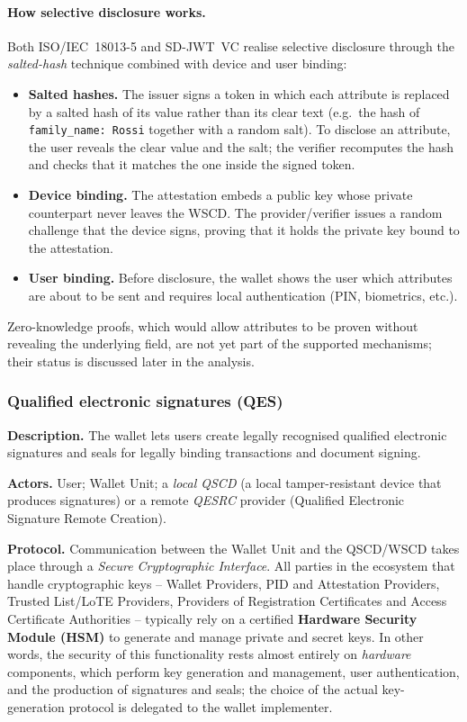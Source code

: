 \documentclass{article}
\begin{document}
\paragraph{How selective disclosure works.} Both ISO/IEC~18013-5 and SD-JWT~VC realise selective disclosure through the
\emph{salted-hash} technique combined with device and user binding:
\begin{itemize}[noitemsep]
  \item \textbf{Salted hashes.} The issuer signs a token in which each attribute is replaced by a salted hash of its
        value rather than its clear text (e.g.\ the hash of \texttt{family\_name:\,Rossi} together with a random salt).
        To disclose an attribute, the user reveals the clear value and the salt; the verifier recomputes the hash and
        checks that it matches the one inside the signed token.
  \item \textbf{Device binding.} The attestation embeds a public key whose private counterpart never leaves the WSCD.
        The provider/verifier issues a random challenge that the device signs, proving that it holds the private key
        bound to the attestation.
  \item \textbf{User binding.} Before disclosure, the wallet shows the user which attributes are about to be sent and
        requires local authentication (PIN, biometrics, etc.).
\end{itemize}
Zero-knowledge proofs, which would allow attributes to be proven without revealing the underlying field, are not yet
part of the supported mechanisms; their status is discussed later in the analysis.

\subsubsection{Qualified electronic signatures (QES)}
\label{eudi:qes}
\textbf{Description.} The wallet lets users create legally recognised qualified electronic signatures and seals for
legally binding transactions and document signing.

\textbf{Actors.} User; Wallet Unit; a \emph{local QSCD} (a local tamper-resistant device that produces signatures) or a
remote \emph{QESRC} provider (Qualified Electronic Signature Remote Creation).

\textbf{Protocol.} Communication between the Wallet Unit and the QSCD/WSCD takes place through a \emph{Secure
Cryptographic Interface}. All parties in the ecosystem that handle cryptographic keys -- Wallet Providers, PID and
Attestation Providers, Trusted List/LoTE Providers, Providers of Registration Certificates and Access Certificate
Authorities -- typically rely on a certified \textbf{Hardware Security Module (HSM)} to generate and manage private and
secret keys. In other words, the security of this functionality rests almost entirely on \emph{hardware} components,
which perform key generation and management, user authentication, and the production of signatures and seals; the choice
of the actual key-generation protocol is delegated to the wallet implementer.
\end{document}
